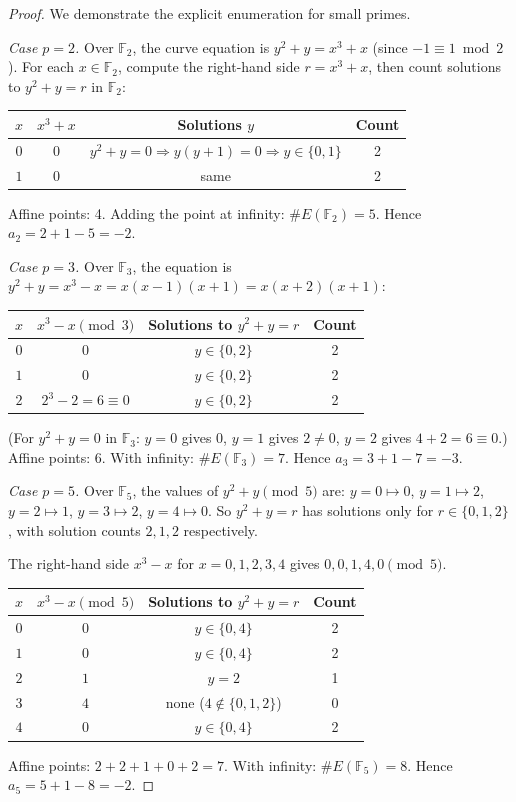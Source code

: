 \documentclass[11pt]{article}
\theoremstyle{plain}
\theoremstyle{definition}
\theoremstyle{remark}
\newcommand{\F}{\mathbb{F}}
\begin{document}
\begin{proof}
We demonstrate the explicit enumeration for small primes.

\emph{Case $p = 2$.} Over $\F_2$, the curve equation is $y^2 + y = x^3 + x$ (since $-1 \equiv 1 \bmod 2$). For each $x \in \F_2$, compute the right-hand side $r = x^3 + x$, then count solutions to $y^2 + y = r$ in $\F_2$:
\begin{center}
\begin{tabular}{cccc}
$x$ & $x^3 + x$ & Solutions $y$ & Count \\
\hline
$0$ & $0$ & $y^2 + y = 0 \Rightarrow y(y+1) = 0 \Rightarrow y \in \{0, 1\}$ & 2 \\
$1$ & $0$ & same & 2
\end{tabular}
\end{center}
Affine points: 4. Adding the point at infinity: $\#E(\F_2) = 5$. Hence $a_2 = 2 + 1 - 5 = -2$. \checkmark

\emph{Case $p = 3$.} Over $\F_3$, the equation is $y^2 + y = x^3 - x = x(x-1)(x+1) = x(x+2)(x+1)$:
\begin{center}
\begin{tabular}{cccc}
$x$ & $x^3 - x \pmod{3}$ & Solutions to $y^2 + y = r$ & Count \\
\hline
$0$ & $0$ & $y \in \{0, 2\}$ & 2 \\
$1$ & $0$ & $y \in \{0, 2\}$ & 2 \\
$2$ & $2^3 - 2 = 6 \equiv 0$ & $y \in \{0, 2\}$ & 2
\end{tabular}
\end{center}
(For $y^2 + y = 0$ in $\F_3$: $y = 0$ gives $0$, $y = 1$ gives $2 \neq 0$, $y = 2$ gives $4+2 = 6 \equiv 0$.) Affine points: 6. With infinity: $\#E(\F_3) = 7$. Hence $a_3 = 3 + 1 - 7 = -3$. \checkmark

\emph{Case $p = 5$.} Over $\F_5$, the values of $y^2 + y \pmod{5}$ are: $y = 0 \mapsto 0$, $y = 1 \mapsto 2$, $y = 2 \mapsto 1$, $y = 3 \mapsto 2$, $y = 4 \mapsto 0$. So $y^2 + y = r$ has solutions only for $r \in \{0, 1, 2\}$, with solution counts $2, 1, 2$ respectively.

The right-hand side $x^3 - x$ for $x = 0, 1, 2, 3, 4$ gives $0, 0, 1, 4, 0 \pmod{5}$.
\begin{center}
\begin{tabular}{cccc}
$x$ & $x^3 - x \pmod{5}$ & Solutions to $y^2 + y = r$ & Count \\
\hline
$0$ & $0$ & $y \in \{0, 4\}$ & 2 \\
$1$ & $0$ & $y \in \{0, 4\}$ & 2 \\
$2$ & $1$ & $y = 2$ & 1 \\
$3$ & $4$ & none ($4 \notin \{0,1,2\}$) & 0 \\
$4$ & $0$ & $y \in \{0, 4\}$ & 2
\end{tabular}
\end{center}
Affine points: $2 + 2 + 1 + 0 + 2 = 7$. With infinity: $\#E(\F_5) = 8$. Hence $a_5 = 5 + 1 - 8 = -2$. \checkmark


\end{proof}
\end{document}
